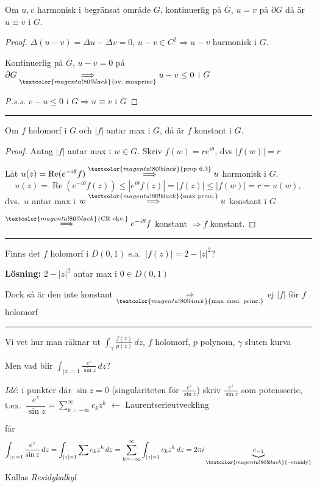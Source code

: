 \begin{theorem}[Kor 6.13]
Om $u, v$ harmonisk i begränsat område $G$, kontinuerlig på $\overline{G}$, $u = v$ på $\partial G$ då är $u \equiv v$ i $G$.
\end{theorem}
\begin{proof}
$\Delta(u - v) = \Delta u - \Delta v = 0$, $u - v \in C^2 \Rightarrow u - v$ harmonisk i $G$.

Kontinuerlig på $\overline{G}$, $u - v = 0$ på $\partial G \underset{\textcolor{magenta!80!black}{\text{sv.\ maxprinc}}}{\Longrightarrow} u - v \le 0$ i $G$

\emph{P.s.s.} $v - u \le 0$ i $G \Rightarrow u \equiv v$ i $G$
\end{proof}

\noindent\rule{\linewidth}{0.4pt}

\begin{theorem}
Om $f$ holomorf i $G$ och $|f|$ antar max i $G$, då är $f$ konstant i $G$.
\end{theorem}
\begin{proof}
Antag $|f|$ antar max i $w \in G$. Skriv $f(w) = re^{i\theta}$, dvs $|f(w)| = r$

Låt $u(z) = \operatorname{Re}(e^{-i\theta} f) \overset{\textcolor{magenta!80!black}{\text{prop 6.3}}}{\Longrightarrow} u$ harmonisk i $G$.
\[ u(z) = \operatorname{Re}(e^{-i\theta} f(z)) \le |e^{i\theta} f(z)| = |f(z)| \le |f(w)| = r = u(w), \]
dvs.\ $u$ antar max i $w \overset{\textcolor{magenta!80!black}{\text{max princ.}}}{\Longrightarrow} u$ konstant i $G$

$\overset{\textcolor{magenta!80!black}{\text{CR ekv.}}}{\Longrightarrow} e^{-i\theta} f$ konstant $\Rightarrow f$ konstant.
\end{proof}

\noindent\rule{\linewidth}{0.4pt}

\begin{example}
Finns det $f$ holomorf i $D(0, 1)$ s.a.\ $|f(z)| = 2 - |z|^2$?

\textbf{Lösning:} $2 - |z|^2$ antar max i $0 \in D(0, 1)$

Dock så är den inte konstant $\underset{\textcolor{magenta!80!black}{\text{max mod.\ princ.}}}{\Rightarrow}$ ej $|f|$ för $f$ holomorf
\end{example}

\noindent\rule{\linewidth}{0.4pt}

Vi vet hur man räknar ut $\displaystyle\int_\gamma \frac{f(z)}{p(z)}\,dz$, $f$ holomorf, $p$ polynom, $\gamma$ sluten kurva

Men vad blir $\displaystyle\int_{|z| = 1} \frac{e^z}{\sin z}\,dz$?

\emph{Idé}: i punkter där $\sin z = 0$ (singulariteten för $\frac{e^z}{\sin z}$) skriv $\frac{e^z}{\sin z}$ som potensserie, t.ex.\ $\dfrac{e^z}{\sin z} = \displaystyle\sum_{k = -\infty}^{\infty} c_k z^k$ \quad \textcolor{magenta!80!black}{$\leftarrow$ Laurentserieutveckling}

får
\[ \int_{|z| = 1} \frac{e^z}{\sin z}\,dz = \int_{|z| = 1} \sum c_k z^k\,dz = \sum_{k = -\infty}^{\infty} \int_{|z| = 1} c_k z^k\,dz = 2\pi i \underbrace{c_{-1}}_{\textcolor{magenta!80!black}{\to \text{residy}}} \]
Kallas \emph{Residykalkyl}
